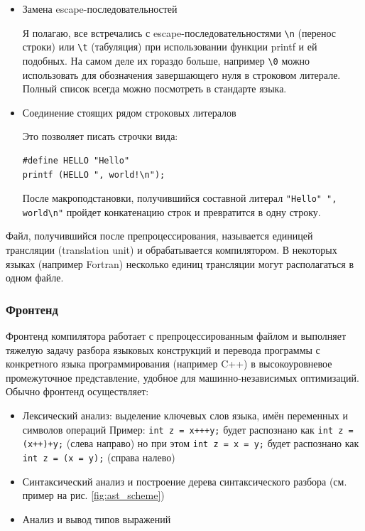 \documentclass[a4paper,12pt,oneside]{article}
\begin{document}
\begin{itemize}
\item Замена escape-последовательностей

Я полагаю, все встречались с escape-последовательностями \lstinline!\n! (перенос строки) или \lstinline!\t! (табуляция) при использовании функции printf и ей подобных. На самом деле их гораздо больше, например \lstinline!\0! можно использовать для обозначения завершающего нуля в строковом литерале. Полный список всегда можно посмотреть в стандарте языка.

\item Соединение стоящих рядом строковых литералов

Это позволяет писать строчки вида:

\begin{lstlisting}
#define HELLO "Hello"
printf (HELLO ", world!\n");
\end{lstlisting}

После макроподстановки, получившийся составной литерал \lstinline!"Hello" ", world\n"! пройдет конкатенацию строк и превратится в одну строку.
\end{itemize}

Файл, получившийся после препроцессирования, называется единицей трансляции (translation unit) и обрабатывается компилятором. В некоторых языках (например Fortran) несколько единиц трансляции могут располагаться в одном файле.

\subsubsection{Фронтенд}\label{subsubsec:Frontend}

Фронтенд компилятора работает с препроцессированным файлом и выполняет тяжелую задачу разбора языковых конструкций и перевода программы с конкретного языка программирования (например C++) в высокоуровневое промежуточное представление, удобное для машинно-независимых оптимизаций. Обычно фронтенд осуществляет:

\begin{itemize}
\item Лексический анализ: выделение ключевых слов языка, имён переменных и символов операций
Пример: \lstinline!int z = x+++y;! будет распознано как \lstinline!int z = (x++)+y;! (слева направо) но при этом \lstinline!int z = x = y;! будет распознано как \lstinline!int z = (x = y);! (справа налево)
\item Синтаксический анализ и построение дерева синтаксического разбора (см. пример на рис. \ref{fig:ast_scheme})
\item Анализ и вывод типов выражений
\end{itemize}
\end{document}
